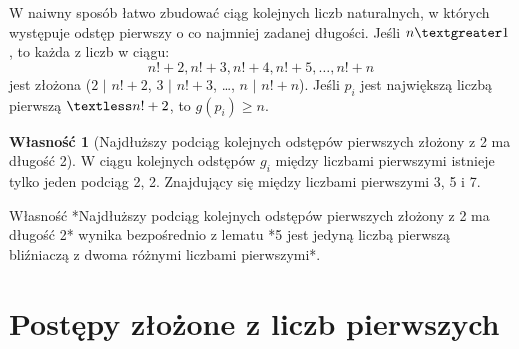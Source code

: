 \documentclass[10pt,onecolumn]{article}
\theoremstyle{definition}
\theoremstyle{hypothesis}
\theoremstyle{capability}
\newtheorem{capability}{Własność}
\begin{document}
W naiwny sposób łatwo zbudować ciąg kolejnych liczb naturalnych, w których występuje odstęp pierwszy o co najmniej zadanej długości. Jeśli $n \textgreater 1$, to każda z liczb w ciągu: $$n!+2, n!+3, n!+4, n!+5, \ldots, n!+n$$ jest złożona ($2$ $\mid$ $n!+2$, $3$ $\mid$ $n!+3$, \ldots, $n$ $\mid$ $n!+n$). Jeśli $p_i$ jest największą liczbą pierwszą $\textless n!+2$, to $g(p_i) \geq n$. 

\begin{capability}[Najdłuższy podciąg kolejnych odstępów pierwszych złożony z 2 ma długość 2]
W ciągu kolejnych odstępów $g_i$ między liczbami pierwszymi istnieje tylko jeden podciąg 2, 2. Znajdujący się między liczbami pierwszymi 3, 5 i 7.
\end{capability}

Własność *Najdłuższy podciąg kolejnych odstępów pierwszych złożony z 2 ma długość 2* wynika bezpośrednio z lematu *5 jest jedyną liczbą pierwszą bliźniaczą z dwoma różnymi liczbami pierwszymi*.

\newpage


\section{Postępy złożone z liczb pierwszych}

\newpage

\end{document}

